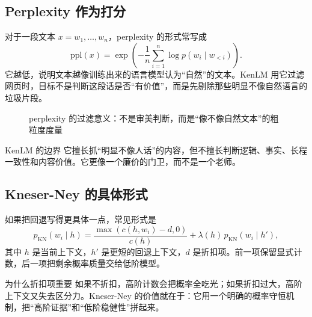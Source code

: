 \subsection{Perplexity 作为打分}

对于一段文本 $x = w_1,\dots,w_n$，perplexity 的形式常写成
\[
\mathrm{ppl}(x)=\exp\!\left(-\frac{1}{n}\sum_{i=1}^n \log p(w_i\mid w_{<i})\right).
\]
它越低，说明文本越像训练出来的语言模型认为“自然”的文本。KenLM 用它过滤网页时，目标不是判断这段话是否“有价值”，而是先剔除那些明显不像自然语言的垃圾片段。

\begin{figure}[H]
\centering
{}
\caption{perplexity 的过滤意义：不是审美判断，而是“像不像自然文本”的粗粒度度量}
\end{figure}

\begin{warningbox}{KenLM 的边界}
它擅长抓“明显不像人话”的内容，但不擅长判断逻辑、事实、长程一致性和内容价值。它更像一个廉价的门卫，而不是一个老师。
\end{warningbox}

\subsection{Kneser-Ney 的具体形式}

如果把回退写得更具体一点，常见形式是
\[
p_{\mathrm{KN}}(w_i\mid h)=\frac{\max(c(h,w_i)-d,0)}{c(h)}+\lambda(h)\,p_{\mathrm{KN}}(w_i\mid h'),
\]
其中 $h$ 是当前上下文，$h'$ 是更短的回退上下文，$d$ 是折扣项。前一项保留显式计数，后一项把剩余概率质量交给低阶模型。

\begin{importantbox}{为什么折扣项重要}
如果不折扣，高阶计数会把概率全吃光；如果折扣过大，高阶上下文又失去区分力。Kneser-Ney 的价值就在于：它用一个明确的概率守恒机制，把“高阶证据”和“低阶稳健性”拼起来。
\end{importantbox}

